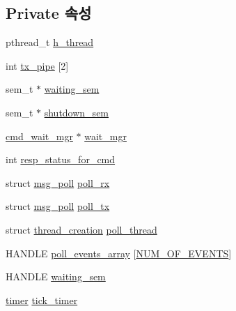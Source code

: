 \subsection*{Private 속성}
\begin{DoxyCompactItemize}
\item 
pthread\+\_\+t \hyperlink{classavdecc__lib_1_1system__layer2__multithreaded__callback_a6e4816698fce9da1e93d69ecbcc78506}{h\+\_\+thread}
\item 
int \hyperlink{classavdecc__lib_1_1system__layer2__multithreaded__callback_a3709435136aa29f099b91ff297640b5b}{tx\+\_\+pipe} \mbox{[}2\mbox{]}
\item 
sem\+\_\+t $\ast$ \hyperlink{classavdecc__lib_1_1system__layer2__multithreaded__callback_a48196bb38ecccc4d99ae5c5d65e8b430}{waiting\+\_\+sem}
\item 
sem\+\_\+t $\ast$ \hyperlink{classavdecc__lib_1_1system__layer2__multithreaded__callback_a7e593cf9438c43b3faa7688ee06ebf1b}{shutdown\+\_\+sem}
\item 
\hyperlink{classavdecc__lib_1_1cmd__wait__mgr}{cmd\+\_\+wait\+\_\+mgr} $\ast$ \hyperlink{classavdecc__lib_1_1system__layer2__multithreaded__callback_af8628baeb5f5db798721c4af01e8b253}{wait\+\_\+mgr}
\item 
int \hyperlink{classavdecc__lib_1_1system__layer2__multithreaded__callback_a6690b9a0a82de7292aef0572fcd2f842}{resp\+\_\+status\+\_\+for\+\_\+cmd}
\item 
struct \hyperlink{structavdecc__lib_1_1system__layer2__multithreaded__callback_1_1msg__poll}{msg\+\_\+poll} \hyperlink{classavdecc__lib_1_1system__layer2__multithreaded__callback_a9d1d17e86300584a39c000430f578ee2}{poll\+\_\+rx}
\item 
struct \hyperlink{structavdecc__lib_1_1system__layer2__multithreaded__callback_1_1msg__poll}{msg\+\_\+poll} \hyperlink{classavdecc__lib_1_1system__layer2__multithreaded__callback_ae4dae56698e2fac11d48cb4a1ff07378}{poll\+\_\+tx}
\item 
struct \hyperlink{structavdecc__lib_1_1system__layer2__multithreaded__callback_1_1thread__creation}{thread\+\_\+creation} \hyperlink{classavdecc__lib_1_1system__layer2__multithreaded__callback_a6dadabe094a6557e788353985a32a74e}{poll\+\_\+thread}
\item 
H\+A\+N\+D\+LE \hyperlink{classavdecc__lib_1_1system__layer2__multithreaded__callback_aab31adfcffa52ef5c5f3b599588804c0}{poll\+\_\+events\+\_\+array} \mbox{[}\hyperlink{classavdecc__lib_1_1system__layer2__multithreaded__callback_a8d9ed11bf786804c7d0c1b70c7d295a6ae3e43a08756b67490b37a0602237a3aa}{N\+U\+M\+\_\+\+O\+F\+\_\+\+E\+V\+E\+N\+TS}\mbox{]}
\item 
H\+A\+N\+D\+LE \hyperlink{classavdecc__lib_1_1system__layer2__multithreaded__callback_adce35e578bf2dd061b0df92b9ac7bb52}{waiting\+\_\+sem}
\item 
\hyperlink{classavdecc__lib_1_1timer}{timer} \hyperlink{classavdecc__lib_1_1system__layer2__multithreaded__callback_ad2f8d6c0a67f5c19741c8ea12eeae4d2}{tick\+\_\+timer}
\end{DoxyCompactItemize}
